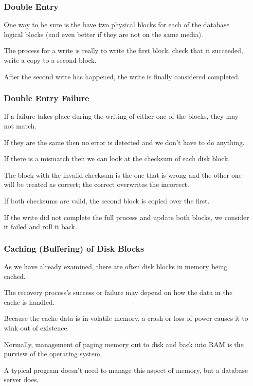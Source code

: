 \begin{frame}
\frametitle{Double Entry}

One way to be sure is the have two physical blocks for each of the database logical blocks (and even better if they are not on the same media). 

The process for a write is really to write the first block, check that it succeeded, write a copy to a second block. 

After the second write has happened, the write is finally considered completed. 


\end{frame}


\begin{frame}
\frametitle{Double Entry Failure}

If a failure takes place during the writing of either one of the blocks, they may not match. 

If they are the same then no error is detected and we don't have to do anything. 

If there is a mismatch then we can look at the checksum of each disk block. 

The block with the invalid checksum is the one that is wrong and the other one will be treated as correct; the correct overwrites the incorrect. 

If both checksums are valid, the second block is copied over the first. 

If the write did not complete the full process and update both blocks, we consider it failed and roll it back.

\end{frame}

\begin{frame}
\frametitle{Caching (Buffering) of Disk Blocks}

As we have already examined, there are often disk blocks in memory being cached. 

The recovery process's success or failure may depend on how the data in the cache is handled. 

Because the cache data is in volatile memory, a crash or loss of power causes it to wink out of existence. 

Normally, management of paging memory out to disk and back into RAM is the purview of the operating system. 

A typical program doesn't need to manage this aspect of memory, but a database server does.


\end{frame}


